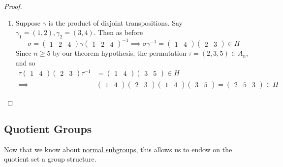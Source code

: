 \begin{proof}
\begin{enumerate}
      \item Suppose $\gamma$ is the product of disjoint transpositions. Say $\gamma_1 = (1, 2), \gamma_2 = (3, 4)$. Then as before 
      \begin{equation}
        \sigma = \begin{pmatrix} 1 & 2 & 4 \end{pmatrix} \gamma \begin{pmatrix} 1 & 2 & 4 \end{pmatrix}^{-1}  \implies \sigma \gamma^{-1} = \begin{pmatrix} 1 & 4 \end{pmatrix} \begin{pmatrix} 2 & 3 \end{pmatrix} \in H
      \end{equation}
      Since $n \geq 5$ by our theorem hypothesis, the permutation $\tau = (2, 3, 5) \in A_n$, and so 
      \begin{align}
        \tau \begin{pmatrix} 1 & 4 \end{pmatrix} \begin{pmatrix} 2 & 3 \end{pmatrix} \tau^{-1} & = \begin{pmatrix} 1 & 4 \end{pmatrix} \begin{pmatrix} 3 & 5 \end{pmatrix} \in H \\
            \implies & \begin{pmatrix} 1 & 4 \end{pmatrix} \begin{pmatrix} 2 & 3 \end{pmatrix} \begin{pmatrix} 1 & 4 \end{pmatrix} \begin{pmatrix} 3 & 5 \end{pmatrix} = \begin{pmatrix} 2 & 5 & 3 \end{pmatrix} \in H
      \end{align}
    \end{enumerate}
  \end{proof}

\subsection{Quotient Groups}

  Now that we know about \hyperref[def:normal_subgroup]{normal subgroups}, this allows us to endow on the quotient set a group structure. 

